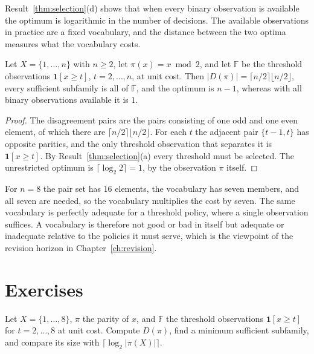 Result~\ref{thm:selection}(d) shows that when every binary observation is available the optimum is logarithmic in the number of decisions. The available observations in practice are a fixed vocabulary, and the distance between the two optima measures what the vocabulary costs.

\begin{newresult}\label{prop:vocab}
Let $X=\{1,\dots,n\}$ with $n\ge2$, let $\pi(x)=x \bmod 2$, and let $\mathbb F$ be the threshold observations $\mathbf 1[x\ge t]$, $t=2,\dots,n$, at unit cost. Then $|D(\pi)|=\lceil n/2\rceil\lfloor n/2\rfloor$, every sufficient subfamily is all of $\mathbb F$, and the optimum is $n-1$, whereas with all binary observations available it is $1$.
\end{newresult}
\begin{proof}
The disagreement pairs are the pairs consisting of one odd and one even element, of which there are $\lceil n/2\rceil\lfloor n/2\rfloor$. For each $t$ the adjacent pair $\{t-1,t\}$ has opposite parities, and the only threshold observation that separates it is $\mathbf 1[x\ge t]$. By Result~\ref{thm:selection}(a) every threshold must be selected. The unrestricted optimum is $\lceil\log_2 2\rceil=1$, by the observation $\pi$ itself.
\end{proof}

For $n=8$ the pair set has $16$ elements, the vocabulary has seven members, and all seven are needed, so the vocabulary multiplies the cost by seven. The same vocabulary is perfectly adequate for a threshold policy, where a single observation suffices. A vocabulary is therefore not good or bad in itself but adequate or inadequate relative to the policies it must serve, which is the viewpoint of the revision horizon in Chapter~\ref{ch:revision}.

\section*{Exercises}

\begin{exercise}
Let $X=\{1,\dots,8\}$, $\pi$ the parity of $x$, and $\mathbb F$ the threshold observations $\mathbf 1[x\ge t]$ for $t=2,\dots,8$ at unit cost. Compute $D(\pi)$, find a minimum sufficient subfamily, and compare its size with $\lceil\log_2|\pi(X)|\rceil$.
\end{exercise}

